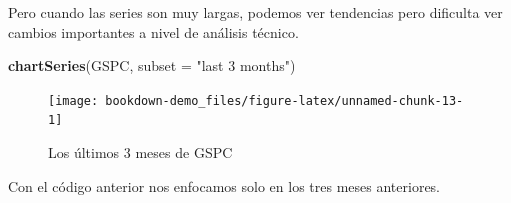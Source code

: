 \documentclass[12pt,]{book}
\newenvironment{Shaded}{\begin{snugshade}}{\end{snugshade}}
\newcommand{\KeywordTok}[1]{\textcolor[rgb]{0.13,0.29,0.53}{\textbf{#1}}}
\newcommand{\DataTypeTok}[1]{\textcolor[rgb]{0.13,0.29,0.53}{#1}}
\newcommand{\StringTok}[1]{\textcolor[rgb]{0.31,0.60,0.02}{#1}}
\newcommand{\NormalTok}[1]{#1}
\begin{document}
Pero cuando las series son muy largas, podemos ver tendencias pero
dificulta ver cambios importantes a nivel de análisis técnico.

\begin{Shaded}
\begin{Highlighting}[]
\KeywordTok{chartSeries}\NormalTok{(GSPC, }\DataTypeTok{subset =} \StringTok{"last 3 months"}\NormalTok{)}
\end{Highlighting}
\end{Shaded}

\begin{figure}

{\centering \texttt{[image: bookdown-demo\_files/figure-latex/unnamed-chunk-13-1]} 

}

\caption{Los últimos 3 meses de GSPC}\label{fig:unnamed-chunk-13}
\end{figure}

Con el código anterior nos enfocamos solo en los tres meses anteriores.


\end{document}
